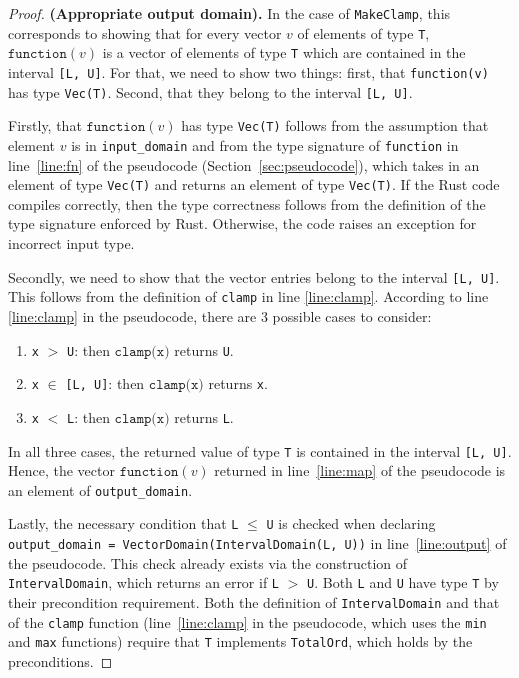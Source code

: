 \documentclass[11pt,a4paper]{article}
\theoremstyle{definition}
\newcommand{\T}{\texttt{T} }
\newcommand{\clamp}{\texttt{clamp}}
\newcommand{\function}{\texttt{function}}
\begin{document}
\begin{proof}
\textbf{(Appropriate output domain).} In the case of \texttt{MakeClamp}, this corresponds to showing that for every vector $v$ of elements of type \texttt{T}, $\function(v)$ is a vector of elements of type \texttt{T} which are contained in the interval \texttt{[L, U]}. For that, we need to show two things: first, that \texttt{function(v)} has type \texttt{Vec(T)}.
Second, that they belong to the interval \texttt{[L, U]}.

Firstly, that $\function(v)$ has type \texttt{Vec(T)} follows from the assumption that element $v$ is in \texttt{input\_domain} and from the type signature of \texttt{function} in line~\ref{line:fn} of the pseudocode (Section~\ref{sec:pseudocode}), which takes in an element of type \texttt{Vec(T)} and returns an element of type \texttt{Vec(T)}. If the Rust code compiles correctly, then the type correctness follows from the definition of the type signature enforced by Rust. Otherwise, the code raises an exception for incorrect input type. 

Secondly, we need to show that the vector entries belong to the interval \texttt{[L, U]}. This follows from the definition of \texttt{clamp} in line \ref{line:clamp}. According to line \ref{line:clamp} in the pseudocode, there are 3 possible cases to consider:
\begin{enumerate}
    \item \texttt{x} $>$ \texttt{U}: then $\clamp\texttt{(x)}$ returns \texttt{U}.
    \item \texttt{x} $\in$ \texttt{[L, U]}: then $\clamp\texttt{(x)}$ returns \texttt{x}.
    \item \texttt{x} $<$ \texttt{L}: then $\clamp\texttt{(x)}$ returns \texttt{L}.
\end{enumerate}
In all three cases, the returned value of type \T is contained in the interval \texttt{[L, U]}. Hence, the vector $\function(v)$ returned in line~\ref{line:map} of the pseudocode is an element of \texttt{output\_domain}.

Lastly, the necessary condition that \texttt{L} $\leq$ \texttt{U} is checked when declaring \texttt{output\_domain = VectorDomain(IntervalDomain(L, U))} in line~\ref{line:output} of the pseudocode. This check already exists via the construction of \texttt{IntervalDomain}, which returns an error if \texttt{L} $>$ \texttt{U}. Both \texttt{L} and \texttt{U} have type \texttt{T} by their precondition requirement. Both the definition of \texttt{IntervalDomain} and that of the \texttt{clamp} function (line~\ref{line:clamp} in the pseudocode, which uses the \texttt{min} and \texttt{max} functions) require that \texttt{T} implements \texttt{TotalOrd}, which holds by the preconditions.


\end{proof}
\end{document}

